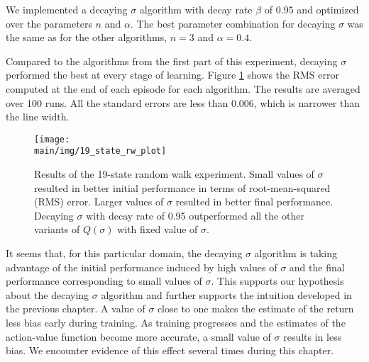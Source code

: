 We implemented a decaying $\sigma$ algorithm with decay rate $\beta$ of $0.95$ and optimized over the parameters $n$ and $\alpha$.
The best parameter combination for decaying $\sigma$ was the same as for the other algorithms, $n = 3$ and $\alpha = 0.4$.

Compared to the algorithms from the first part of this experiment, decaying $\sigma$ performed the best at every stage of learning.
Figure \ref{fig:19staterw_plot} shows the RMS error computed at the end of each episode for each algorithm. 
The results are averaged over 100 runs.
All the standard errors are less than 0.006, which is narrower than the line width.

\begin{figure}[t]
    \centering
    \texttt{[image: \\main/img/19\_state\_rw\_plot]}
    \caption[Results of the 19-State Random Walk Experiment] {
    Results of the 19-state random walk experiment. 
    Small values of $\sigma$ resulted in better initial performance in terms of root-mean-squared (RMS) error.
    Larger values of $\sigma$ resulted in better final performance.
    Decaying $\sigma$ with decay rate of 0.95 outperformed all the other variants of $Q(\sigma)$ with fixed value of $\sigma$.
    }
    \label{fig:19staterw_plot}
\end{figure}


It seems that, for this particular domain, the decaying $\sigma$ algorithm is taking advantage of the initial performance induced by high values of $\sigma$ and the final performance corresponding to small values of $\sigma$.
This supports our hypothesis about the decaying $\sigma$ algorithm and further supports the intuition developed in the previous chapter.
A value of $\sigma$ close to one makes the estimate of the return less bias early during training.
As training progresses and the estimates of the action-value function become more accurate, a small value of $\sigma$  results in less bias.
We encounter evidence of this effect several times during this chapter.

